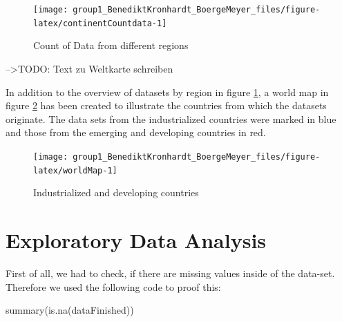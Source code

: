 \documentclass[
  11pt,
  a4paper,
  twoside]{scrbook}
\newenvironment{Shaded}{\begin{snugshade}}{\end{snugshade}}
\newcommand{\FunctionTok}[1]{\textcolor[rgb]{0.00,0.00,0.00}{#1}}
\newcommand{\NormalTok}[1]{#1}
\begin{document}
\begin{figure}

{\centering \texttt{[image: group1\_BenediktKronhardt\_BoergeMeyer\_files/figure-latex/continentCountdata-1]} 

}

\caption{Count of Data from different regions}\label{fig:continentCountdata}
\end{figure}

--\textgreater TODO: Text zu Weltkarte schreiben

In addition to the overview of datasets by region in figure \ref{fig:continentCountdata}, a world map in figure \ref{fig:worldMap} has been created to illustrate the countries from which the datasets originate. The data sets from the industrialized countries were marked in blue and those from the emerging and developing countries in red.

\begin{figure}

{\centering \texttt{[image: group1\_BenediktKronhardt\_BoergeMeyer\_files/figure-latex/worldMap-1]} 

}

\caption{Industrialized and developing countries}\label{fig:worldMap}
\end{figure}

\hypertarget{exploratory-data-analysis}{%
\section{Exploratory Data Analysis}\label{exploratory-data-analysis}}

First of all, we had to check, if there are missing values inside of the data-set. Therefore we used the following code to proof this:

\linespread{1}

\begin{Shaded}
\begin{Highlighting}[]
\FunctionTok{summary}\NormalTok{(}\FunctionTok{is.na}\NormalTok{(dataFinished))}
\end{Highlighting}
\end{Shaded}

\linespread{1}
\end{document}
